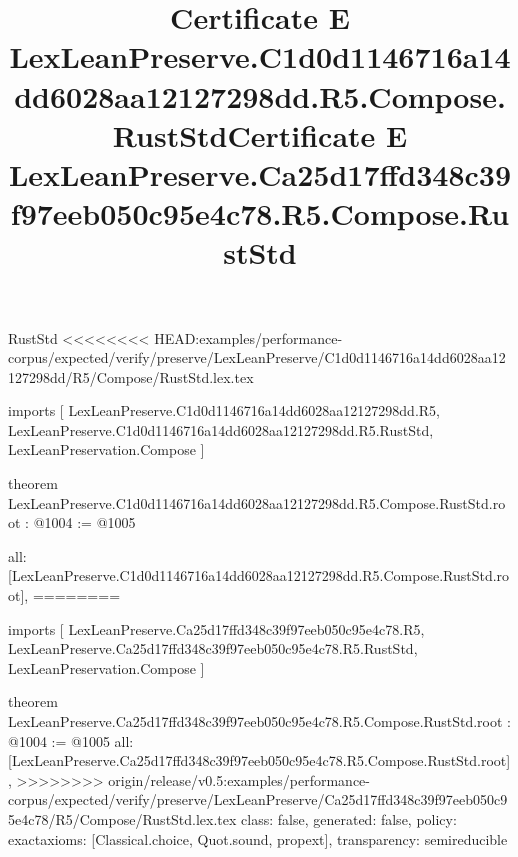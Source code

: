 \begin{lexlean}{RustStd}
<<<<<<<< HEAD:examples/performance-corpus/expected/verify/preserve/LexLeanPreserve/C1d0d1146716a14dd6028aa12127298dd/R5/Compose/RustStd.lex.tex
\title{Certificate E LexLeanPreserve.C1d0d1146716a14dd6028aa12127298dd.R5.Compose.RustStd}
\begin{coremodule}
imports [
  LexLeanPreserve.C1d0d1146716a14dd6028aa12127298dd.R5,
  LexLeanPreserve.C1d0d1146716a14dd6028aa12127298dd.R5.RustStd,
  LexLeanPreservation.Compose
]

theorem LexLeanPreserve.C1d0d1146716a14dd6028aa12127298dd.R5.Compose.RustStd.root : @1004 := @1005 {
  all: [LexLeanPreserve.C1d0d1146716a14dd6028aa12127298dd.R5.Compose.RustStd.root],
========
\title{Certificate E LexLeanPreserve.Ca25d17ffd348c39f97eeb050c95e4c78.R5.Compose.RustStd}
\begin{coremodule}
imports [
  LexLeanPreserve.Ca25d17ffd348c39f97eeb050c95e4c78.R5,
  LexLeanPreserve.Ca25d17ffd348c39f97eeb050c95e4c78.R5.RustStd,
  LexLeanPreservation.Compose
]

theorem LexLeanPreserve.Ca25d17ffd348c39f97eeb050c95e4c78.R5.Compose.RustStd.root : @1004 := @1005 {
  all: [LexLeanPreserve.Ca25d17ffd348c39f97eeb050c95e4c78.R5.Compose.RustStd.root],
>>>>>>>> origin/release/v0.5:examples/performance-corpus/expected/verify/preserve/LexLeanPreserve/Ca25d17ffd348c39f97eeb050c95e4c78/R5/Compose/RustStd.lex.tex
  class: false,
  generated: false,
  policy: exact{axioms: [Classical.choice, Quot.sound, propext]},
  transparency: semireducible
}


\end{coremodule}}
\end{coremodule}
\end{lexlean}
